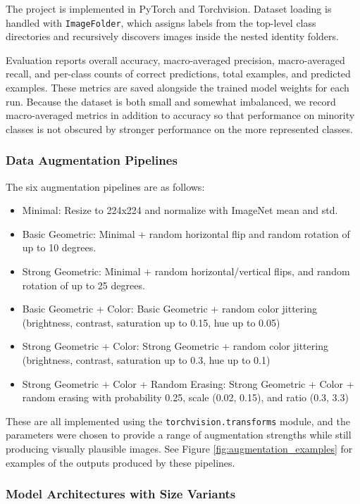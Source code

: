 \documentclass[conference]{IEEEtran}
\begin{document}
The project is implemented in PyTorch and Torchvision. Dataset loading is handled with \texttt{ImageFolder}, which assigns labels from the top-level class directories and recursively discovers images inside the nested identity folders.

Evaluation reports overall accuracy, macro-averaged precision, macro-averaged recall, and per-class counts of correct predictions, total examples, and predicted examples. These metrics are saved alongside the trained model weights for each run. Because the dataset is both small and somewhat imbalanced, we record macro-averaged metrics in addition to accuracy so that performance on minority classes is not obscured by stronger performance on the more represented classes.

\subsubsection{Data Augmentation Pipelines}

The six augmentation pipelines are as follows:

\begin{itemize}
    \item Minimal: Resize to 224x224 and normalize with ImageNet mean and std.
    \item Basic Geometric: Minimal + random horizontal flip and random rotation of up to 10 degrees.
    \item Strong Geometric: Minimal + random horizontal/vertical flips, and random rotation of up to 25 degrees.
    \item Basic Geometric + Color: Basic Geometric + random color jittering (brightness, contrast, saturation up to 0.15, hue up to 0.05)
    \item Strong Geometric + Color: Strong Geometric + random color jittering (brightness, contrast, saturation up to 0.3, hue up to 0.1)
    \item Strong Geometric + Color + Random Erasing: Strong Geometric + Color + random erasing with probability 0.25, scale (0.02, 0.15), and ratio (0.3, 3.3)
\end{itemize}

These are all implemented using the \texttt{torchvision.transforms} module, and the parameters were chosen to provide a range of augmentation strengths while still producing visually plausible images. See Figure \ref{fig:augmentation_examples} for examples of the outputs produced by these pipelines.

\subsubsection{Model Architectures with Size Variants}
\end{document}
